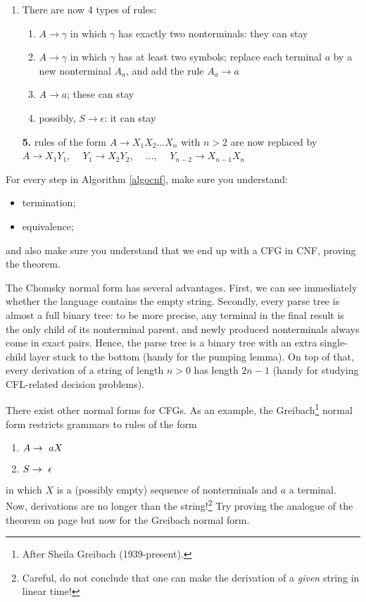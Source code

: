 \begin{code}
\begin{enumerate}
\item There are now 4 types of rules:
\begin{enumerate}
\item $A \rightarrow \gamma$ in which $\gamma$ has exactly two nonterminals:
  they can stay

\item $A \rightarrow \gamma$ in which $\gamma$ has at least two symbols;
  replace each terminal $a$ by a new nonterminal $A_a$, and add the
  rule $A_a \rightarrow a$

\item $A \rightarrow a$; these can stay
\item possibly, $S \rightarrow \epsilon$: it can stay

\end{enumerate}

\item[{\bf 5.}] rules of the form $A \rightarrow X_1X_2...X_n$ with $n
  > 2$ are now replaced by \\ $A \rightarrow X_1Y_1$, ~~$Y_1 \rightarrow
  X_2Y_2$, ~~..., ~~$Y_{n-2} \rightarrow X_{n-1}X_n$

\end{enumerate}
\end{code}

\begin{exercise}
For every step in Algorithm \ref{algocnf}, make sure you understand:
\begin{itemize}
	\item termination;
	\item equivalence;
\end{itemize}
and also make sure you understand that we end up with a CFG in CNF, proving the theorem.
\end{exercise}

The Chomsky normal form has several advantages. First, we can see immediately
whether the language contains the empty string. Secondly, every parse tree is
almost a full binary tree: to be more precise, any terminal in the final result is the only child of its nonterminal parent, and newly produced nonterminals always come in exact pairs. Hence, the parse tree is a binary tree with an extra single-child layer stuck to the bottom (handy for the pumping lemma). On top of that, every derivation of a string of length $n > 0$ has length $2n-1$ (handy for studying CFL-related decision problems).

There exist other normal forms for CFGs. As an example, the
Greibach\footnote{After Sheila Greibach (1939-present).} normal form restricts grammars to
rules of the form
\begin{enumerate}
	\item $A \rightarrow~ aX$
	\item $S \rightarrow~ \epsilon$	
\end{enumerate}
in which $X$ is a (possibly empty) sequence of nonterminals and $a$ a
terminal. Now, derivations are no longer than the
string!\footnote{Careful, do not conclude that one can make the
  derivation of a \emph{given} string in linear time!} Try proving the
analogue of the theorem on page \pageref{chomskynormalform} but now
for the Greibach normal form.

